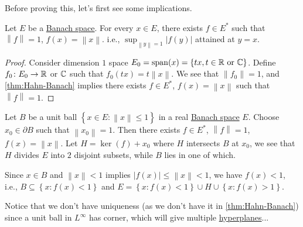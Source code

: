 Before proving this, let's first see some implications.

\begin{theorem}\label{thm:supporting-functional}
	Let \(E\) be a \hyperref[def:Banach-space]{Banach space}. For every \(x\in E\), there exists \(f\in E^{\ast} \)  such that \(\left\lVert f\right\rVert = 1\), \(f(x) = \left\lVert x\right\rVert \). i.e., \(\sup _{\left\lVert y\right\rVert = 1} \left\vert f(y) \right\vert \) attained at \(y = x\).
\end{theorem}
\begin{proof}
	Consider dimension \(1\) space \(E_0 = \mathop{\mathrm{span}}(x) = \left\{ tx,t\in \mathbb{\MakeUppercase{r}} \text{ or }\mathbb{\MakeUppercase{c}}   \right\} \). Define \(f_0\colon E_0 \to \mathbb{\MakeUppercase{r}} \) or \(\mathbb{\MakeUppercase{c}} \) such that \(f_0(tx) = t \left\lVert x\right\rVert \). We see that \(\left\lVert f_0\right\rVert = 1\), and \autoref{thm:Hahn-Banach} implies there exists \(f\in E^{\ast} \), \(f(x) = \left\lVert x\right\rVert \) such that \(\left\lVert f\right\rVert =1\).
\end{proof}

\begin{remark}
	Let \(B\) be a unit ball \(\left\{ x\in E \colon \left\lVert x\right\rVert \leq 1\right\} \) in a real \hyperref[def:Banach-space]{Banach space} \(E\). Choose \(x_0 \in \partial B\) such that \(\left\lVert x_0\right\rVert = 1\). Then there exists \(f\in E^{\ast} \), \(\left\lVert f\right\rVert = 1\), \(f(x) = \left\lVert x\right\rVert \). Let \(H = \ker(f) + x_0\) where \(H\) intersects \(B\) at \(x_0\), we see that \(H\) divides \(E\) into \(2\) disjoint subsets, while \(B\) lies in one of which.
\end{remark}
\begin{explanation}
	Since \(x\in B\) and \(\left\lVert x\right\rVert < 1\) implies \(\left\vert f(x) \right\vert \leq \left\lVert x\right\rVert < 1\), we have \(f(x) < 1\), i.e., \(B\subseteq \left\{ x\colon f(x) < 1 \right\} \) and \(E = \left\{ x\colon f(x) < 1 \right\} \cup H \cup \left\{ x\colon f(x) > 1 \right\}\).
\end{explanation}

\begin{note}
	Notice that we don't have uniqueness (as we don't have it in \autoref{thm:Hahn-Banach}) since a unit ball in \(L^{\infty } \) has corner, which will give multiple \hyperref[def:hyperplane]{hyperplanes}...
\end{note}